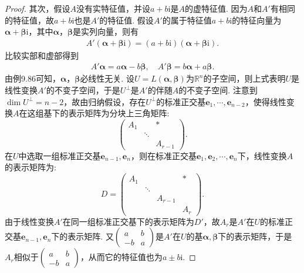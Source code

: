 \documentclass[../../main.tex]{subfiles}%
\begin{document}
\begin{proof}
其次，假设\(A\)没有实特征值，并设\(a + b\mathrm{i}\)是\(A\)的虚特征值. 因为\(A\)和\(A'\)有相同的特征值，故\(a + b\mathrm{i}\)也是\(A'\)的特征值. 假设\(A'\)的属于特征值\(a + b\mathrm{i}\)的特征向量为\(\boldsymbol{\alpha}+ \boldsymbol{\beta}\mathrm{i}\)，其中\(\boldsymbol{\alpha}\)，\(\boldsymbol{\beta}\)是实列向量，则有
\begin{align*}
A'(\boldsymbol{\alpha}+ \boldsymbol{\beta}\mathrm{i})=(a + b\mathrm{i})(\boldsymbol{\alpha}+ \boldsymbol{\beta}\mathrm{i}).
\end{align*}
比较实部和虚部得到
\begin{align*}
A'\boldsymbol{\alpha}=a\boldsymbol{\alpha}-b\boldsymbol{\beta},\quad A'\boldsymbol{\beta}=b\boldsymbol{\alpha}+a\boldsymbol{\beta}.
\end{align*}
由例9.86可知，\(\boldsymbol{\alpha}\)，\(\boldsymbol{\beta}\)必线性无关. 设\(U = L(\boldsymbol{\alpha},\boldsymbol{\beta})\)为\(\mathbb{R}^n\)的子空间，则上式表明\(U\)是线性变换\(A'\)的不变子空间，于是\(U^\perp\)是\(A'\)的伴随\(A\)的不变子空间. 注意到\(\dim U^\perp=n - 2\)，故由归纳假设，存在\(U^\perp\)的标准正交基\(\boldsymbol{e}_1,\cdots,\boldsymbol{e}_{n - 2}\)，使得线性变换\(A\)在这组基下的表示矩阵为分块上三角矩阵:
\[
\begin{pmatrix}
A_1 & & * \\
& \ddots & \\
& & A_{r - 1}
\end{pmatrix}.
\]
在\(U\)中选取一组标准正交基\(\boldsymbol{e}_{n - 1},\boldsymbol{e}_n\)，则在标准正交基\(\boldsymbol{e}_1,\boldsymbol{e}_2,\cdots,\boldsymbol{e}_n\)下，线性变换\(A\)的表示矩阵为:
\[
D = 
\begin{pmatrix}
A_1 & & & * \\
& \ddots & & \\
& & A_{r - 1} & \\
& & & A_r
\end{pmatrix}.
\]
由于线性变换\(A'\)在同一组标准正交基下的表示矩阵为\(D'\)，故\(A_r\)是\(A'\)在\(U\)的标准正交基\(\boldsymbol{e}_{n - 1},\boldsymbol{e}_n\)下的表示矩阵. 又\(\begin{pmatrix}a&b\\-b&a\end{pmatrix}\)是\(A'\)在\(U\)的基\(\boldsymbol{\alpha},\boldsymbol{\beta}\)下的表示矩阵，于是\(A_r\)相似于\(\begin{pmatrix}a&b\\-b&a\end{pmatrix}\)，从而它的特征值也为\(a\pm b\mathrm{i}\). 
\end{proof}
\end{document}
